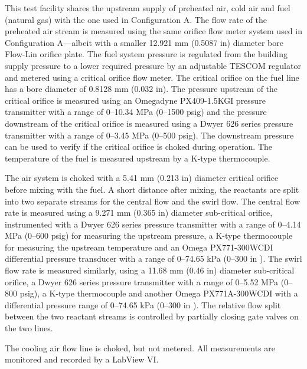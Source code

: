

This test facility shares the upstream supply of preheated air, cold air and fuel (natural gas) with the one used in Configuration A.
The flow rate of the preheated air stream is measured using the same orifice flow meter system used in Configuration A---albeit with a smaller 12.921 mm (0.5087 in) diameter bore Flow-Lin orifice plate.
The fuel system pressure is regulated from the building supply pressure to a lower required pressure by an adjustable TESCOM regulator and metered using a critical orifice flow meter.
The critical orifice on the fuel line has a bore diameter of 0.8128 mm (0.032 in).
The pressure upstream of the critical orifice is measured using an Omegadyne PX409-1.5KGI pressure transmitter with a range of 0--10.34 MPa (0--1500 psig) and the pressure downstream of the critical orifice is measured using a Dwyer 626 series pressure transmitter with a range of 0--3.45 MPa (0--500 psig).
The downstream pressure can be used to verify if the critical orifice is choked during operation.
The temperature of the fuel is measured upstream by a K-type thermocouple.

The air system is choked with a 5.41 mm (0.213 in) diameter critical orifice before mixing with the fuel.
A short distance after mixing, the reactants are split into two separate streams for the central flow and the swirl flow.
The central flow rate is measured using a 9.271 mm (0.365 in) diameter sub-critical orifice, instrumented with a Dwyer 626 series pressure transmitter with a range of 0--4.14 MPa (0--600 psig) for measuring the upstream pressure, a K-type thermocouple for measuring the upstream temperature and an Omega PX771-300WCDI differential pressure transducer with a range of 0--74.65 kPa (0--300 in ).
The swirl flow rate is measured similarly, using a 11.68 mm (0.46 in) diameter sub-critical orifice, a Dwyer 626 series pressure transmitter with a range of 0--5.52 MPa (0--800 psig), a K-type thermocouple and another Omega PX771A-300WCDI with a differential pressure range of 0--74.65 kPa (0--300 in ).
The relative flow split between the two reactant streams is controlled by partially closing gate valves on the two lines.

The cooling air flow line is choked, but not metered.
All measurements are monitored and recorded by a LabView VI.


